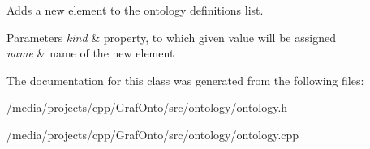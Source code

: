 \-Adds a new element to the ontology definitions list. 


\begin{DoxyParams}{\-Parameters}
{\em kind} & property, to which given value will be assigned \\
\hline
{\em name} & name of the new element \\
\hline
\end{DoxyParams}


\-The documentation for this class was generated from the following files\-:\begin{DoxyCompactItemize}
\item 
/media/projects/cpp/\-Graf\-Onto/src/ontology/ontology.\-h\item 
/media/projects/cpp/\-Graf\-Onto/src/ontology/ontology.\-cpp\end{DoxyCompactItemize}
